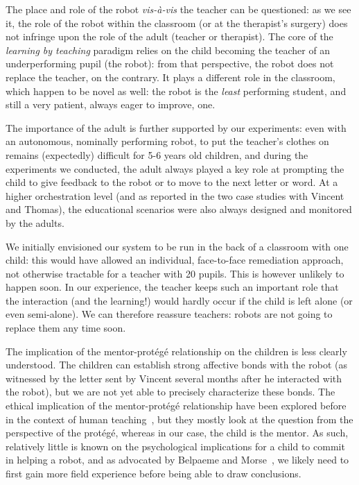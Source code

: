 \documentclass{article}
\begin{document}
The place and role of the robot \textit{vis-à-vis} the teacher can be
questioned: as we see it, the role of the robot within the classroom (or at the
therapist's surgery) does not infringe upon the role of the adult (teacher or
therapist).  The core of the \emph{learning by teaching} paradigm relies on the
child becoming the teacher of an underperforming pupil (the robot): from that
perspective, the robot does not replace the teacher, on the contrary. It plays a
different role in the classroom, which happen to be novel as well: the robot is
the \emph{least} performing student, and still a very patient, always eager to
improve, one.

The importance of the adult is further supported by our experiments: even with
an autonomous, nominally performing robot, to put the teacher's clothes on
remains (expectedly) difficult for 5-6 years old children, and during the
experiments we conducted, the adult always played a key role at prompting the
child to give feedback to the robot or to move to the next letter or word.  At a
higher orchestration level (and as reported in the two case studies with Vincent
and Thomas), the educational scenarios were also always designed and monitored
by the adults.

We initially envisioned our system to be run in the back of a classroom with one
child: this would have allowed an individual, face-to-face remediation approach,
not otherwise tractable for a teacher with 20 pupils.  This is however unlikely
to happen soon. In our experience, the teacher keeps such an important role that
the interaction (and the learning!) would hardly occur if the child is left
alone (or even semi-alone). We can therefore reassure teachers: robots are not
going to replace them any time soon.

The implication of the mentor-protégé relationship on the children is less
clearly understood. The children can establish strong affective bonds with the robot (as
witnessed by the letter sent by Vincent several months after he interacted with
the robot), but we are not yet able to precisely characterize these bonds. The
ethical implication of the mentor-protégé relationship have been explored before
in the context of human teaching~\cite{brad1999mentor,wendelyn2008context}, but
they mostly look at the question from the perspective of the protégé, whereas in our
case, the child is the mentor. As such, relatively little is known on the
psychological implications for a child to commit in helping a robot, and as
advocated by Belpaeme and Morse~\cite{belpaeme2010time}, we likely need to first
gain more field experience before being able to draw conclusions.
\end{document}
